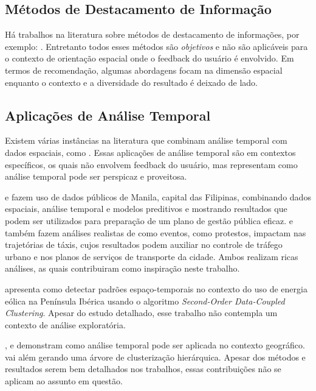 \subsection{Métodos de Destacamento de Informação}


Há trabalhos na literatura sobre métodos de destacamento de informações, por exemplo: . Entretanto todos esses métodos são {\em objetivos} e não são aplicáveis para o contexto de orientação espacial onde o feedback do usuário é envolvido. Em termos de recomendação, algumas abordagens focam na dimensão espacial \cite{Bao2015,Levandoski:2012} enquanto o contexto e a diversidade do resultado é deixado de lado.

\subsection{Aplicações de Análise Temporal}

Existem várias instâncias na literatura que combinam análise temporal com dados espaciais, como . Essas aplicações de análise temporal são em contextos específicos, os quais não envolvem feedback do usuário, mas representam como análise temporal pode ser perspicaz e proveitosa.

 e  fazem uso de dados públicos de Manila, capital das Filipinas, combinando dados espaciais, análise temporal e modelos preditivos e mostrando resultados que podem ser utilizados para preparação de um plano de gestão pública eficaz.  e  também fazem análises realistas de como eventos, como protestos, impactam nas trajetórias de táxis, cujos resultados podem auxiliar no controle de tráfego urbano e nos planos de serviços de transporte da cidade. Ambos realizam ricas análises, as quais contribuiram como inspiração neste trabalho.

 apresenta como detectar padrões espaço-temporais no contexto do uso de energia eólica na Península Ibérica usando o algoritmo {\em Second-Order Data-Coupled Clustering}. Apesar do estudo detalhado, esse trabalho não contempla um contexto de análise exploratória.

,  e  demonstram como análise temporal pode ser aplicada no contexto geográfico.  vai além gerando uma árvore de clusterização hierárquica. Apesar dos métodos e resultados serem bem detalhados nos trabalhos, essas contribuições não se aplicam ao assunto em questão.

